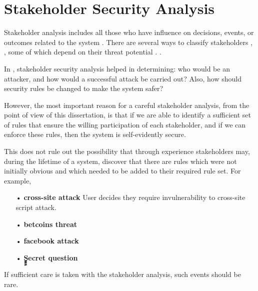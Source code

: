 \section{Stakeholder Security Analysis}\label{stakeholders}

Stakeholder analysis includes all those who have
influence on decisions, events, or outcomes related to
the system \cite{project2018guide,rose2013guide}. There are several ways to classify stakeholders  
\iflonger\cite{reed2009s,maguire2012role,savage1991strategies,maynard2011stakeholders,bourne2016stakeholder,grimble1997stakeholder,billgren2008approaching},
\else
\cite{maguire2012role,maynard2011stakeholders,bourne2016stakeholder},
\fi
some of which depend on their threat potential
\iflonger
\cite{almorsy2016analysis,diver2007information,savage1991strategies,scholl2005interoperability}.
\else
\cite{almorsy2016analysis,diver2007information,savage1991strategies}.
\fi

In \cite{sheniar2018experiments}, stakeholder security analysis helped in determining: who would
be an attacker, and how would a successful attack be carried out? Also,
how should security rules be changed to make the system safer?

However, the most important reason for a careful stakeholder analysis, from
the point of view of this dissertation, is that if we are able to identify a sufficient
set of rules that ensure the willing participation of each stakeholder, and 
if we can enforce these rules, then the system is self-evidently secure. 

This does not rule out the possibility that through experience stakeholders may, during the lifetime of a system, discover that there are rules which were not initially obvious and which needed to be added to their required rule set. 
\if
For example, 
\begin{itemize}
\item[•] \textbf{cross-site attack} User decides they require invulnerability to cross-site script attack.
\item[•] \textbf{betcoins threat} 
\item[•] \textbf{facebook attack} 
\item[•] \textbf{ٍٍٍSecret question} 

\end{itemize}

\fi
 If sufficient care is taken with the stakeholder analysis, such events should be rare.



